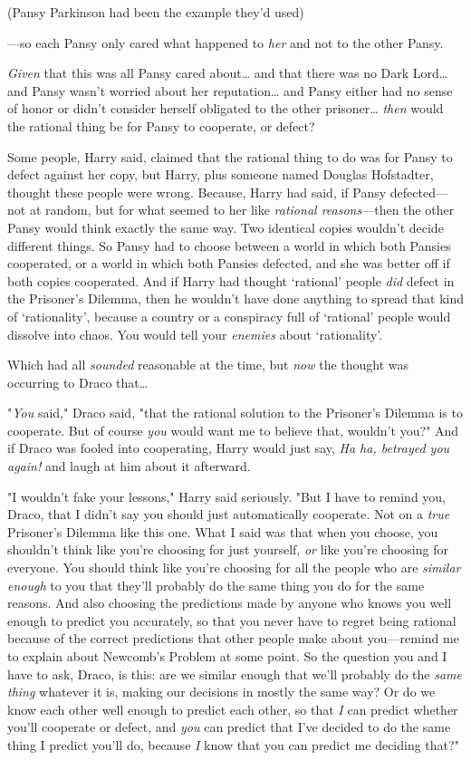 (Pansy Parkinson had been the example they'd used)

---so each Pansy only cared what happened to \emph{her} and not to the other 
Pansy.

\emph{Given} that this was all Pansy cared about{\ldots} and that there was no 
Dark Lord{\ldots} and Pansy wasn't worried about her reputation{\ldots} and 
Pansy either had no sense of honor or didn't consider herself obligated to the 
other prisoner{\ldots} \emph{then} would the rational thing be for Pansy to 
cooperate, or defect?

Some people, Harry said, claimed that the rational thing to do was for Pansy to 
defect against her copy, but Harry, plus someone named Douglas Hofstadter, 
thought these people were wrong. Because, Harry had said, if Pansy 
defected---not at random, but for what seemed to her like \emph{rational 
reasons}---then the other Pansy would think exactly the same way. Two identical 
copies wouldn't decide different things. So Pansy had to choose between a world 
in which both Pansies cooperated, or a world in which both Pansies defected, 
and she was better off if both copies cooperated. And if Harry had thought 
`rational' people \emph{did} defect in the Prisoner's Dilemma, then he wouldn't 
have done anything to spread that kind of `rationality', because a country or a 
conspiracy full of `rational' people would dissolve into chaos. You would tell 
your \emph{enemies} about `rationality'.

Which had all \emph{sounded} reasonable at the time, but \emph{now} the thought 
was occurring to Draco that{\ldots}

"\emph{You} said," Draco said, "that the rational solution to the Prisoner's 
Dilemma is to cooperate. But of course \emph{you} would want me to believe 
that, wouldn't you?" And if Draco was fooled into cooperating, Harry would just 
say, \emph{Ha ha, betrayed you again!} and laugh at him about it afterward.

"I wouldn't fake your lessons," Harry said seriously. "But I have to remind 
you, Draco, that I didn't say you should just automatically cooperate. Not on a 
\emph{true} Prisoner's Dilemma like this one. What I said was that when you 
choose, you shouldn't think like you're choosing for just yourself, \emph{or} 
like you're choosing for everyone. You should think like you're choosing for 
all the people who are \emph{similar enough} to you that they'll probably do 
the same thing you do for the same reasons. And also choosing the predictions 
made by anyone who knows you well enough to predict you accurately, so that you 
never have to regret being rational because of the correct predictions that 
other people make about you---remind me to explain about Newcomb's Problem at 
some point. So the question you and I have to ask, Draco, is this: are we 
similar enough that we'll probably do the \emph{same thing} whatever it is, 
making our decisions in mostly the same way? Or do we know each other well 
enough to predict each other, so that \emph{I} can predict whether you'll 
cooperate or defect, and \emph{you} can predict that I've decided to do the 
same thing I predict you'll do, because \emph{I} know that you can predict me 
deciding that?"

